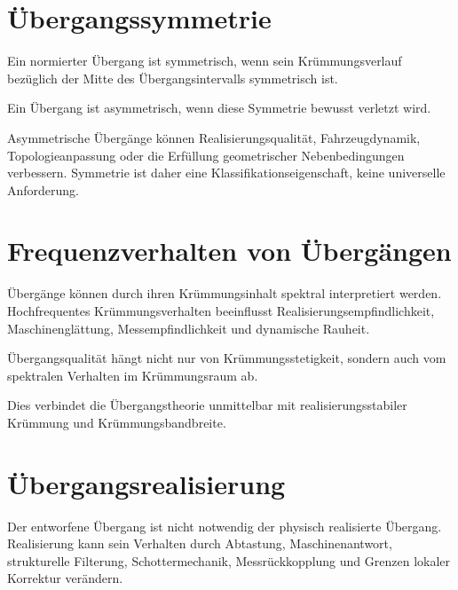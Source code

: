 \section{Übergangssymmetrie}

\begin{definition}
\label{def:transition-symmetry}
Ein normierter Übergang ist symmetrisch, wenn sein Krümmungsverlauf bezüglich
der Mitte des Übergangsintervalls symmetrisch ist.
\end{definition}

\begin{definition}
\label{def:transition-asymmetry}
Ein Übergang ist asymmetrisch, wenn diese Symmetrie bewusst verletzt wird.
\end{definition}

Asymmetrische Übergänge können Realisierungsqualität, Fahrzeugdynamik,
Topologieanpassung oder die Erfüllung geometrischer Nebenbedingungen
verbessern. Symmetrie ist daher eine Klassifikationseigenschaft, keine
universelle Anforderung.

\section{Frequenzverhalten von Übergängen}

Übergänge können durch ihren Krümmungsinhalt spektral interpretiert werden.
Hochfrequentes Krümmungsverhalten beeinflusst
Realisierungsempfindlichkeit, Maschinenglättung, Messempfindlichkeit und
dynamische Rauheit.

\begin{proposition}
\label{prop:spectral-transition-principle}
Übergangsqualität hängt nicht nur von Krümmungsstetigkeit, sondern auch vom
spektralen Verhalten im Krümmungsraum ab.
\end{proposition}

Dies verbindet die Übergangstheorie unmittelbar mit realisierungsstabiler
Krümmung und Krümmungsbandbreite.

\section{Übergangsrealisierung}

Der entworfene Übergang ist nicht notwendig der physisch realisierte
Übergang. Realisierung kann sein Verhalten durch Abtastung, Maschinenantwort,
strukturelle Filterung, Schottermechanik, Messrückkopplung und Grenzen lokaler
Korrektur verändern.

